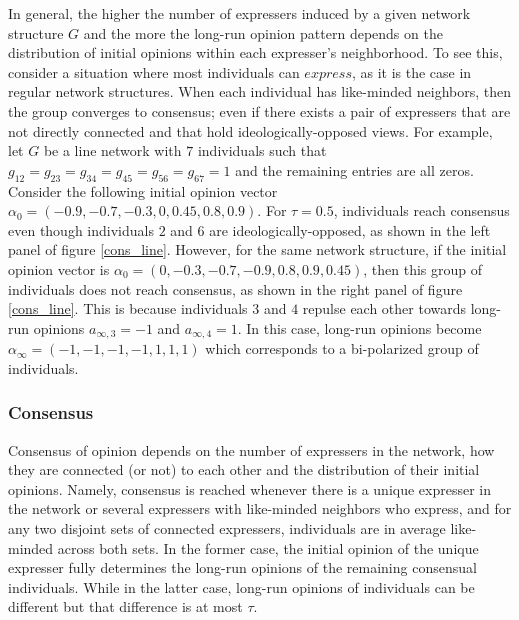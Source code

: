 \documentclass{article}
\begin{document}
In general, the higher the number of expressers induced by a given network structure $G$ and the more the long-run opinion pattern depends on the distribution of initial opinions within each expresser's neighborhood. To see this, consider a situation where most individuals can $express$, as it is the case in regular network structures. When each individual has like-minded neighbors, then the group converges to consensus; even if there exists a pair of expressers that are not directly connected and that hold ideologically-opposed views. For example, let $G$ be a line network with $7$ individuals such that $g_{12}=g_{23}=g_{34}=g_{45}=g_{56}=g_{67}=1$ and the remaining entries are all zeros. Consider the following initial opinion vector $\alpha_{0}=(-0.9,-0.7,-0.3,0,0.45,0.8,0.9)$. For $\tau=0.5$, individuals reach consensus even though individuals $2$ and $6$ are ideologically-opposed, as shown in the left panel of figure \ref{cons_line}.  However, for the same network structure, if the initial opinion vector is $\alpha_{0}=(0,-0.3,-0.7,-0.9,0.8,0.9,0.45)$, then this group of individuals does not reach consensus, as shown in the right panel of figure \ref{cons_line}. This is because individuals $3$ and $4$ repulse each other towards long-run opinions $a_{\infty,3} =-1$ and $a_{\infty,4} = 1$. In this case, long-run opinions become $\alpha_{\infty}=(-1 , -1 , -1, -1, 1, 1,1)$ which corresponds to a bi-polarized group of individuals. 



\subsubsection{Consensus}
Consensus of opinion depends on the number of expressers in the network, how they are connected (or not) to each other and the distribution of their initial opinions. Namely, consensus is reached whenever there is a unique expresser in the network or several expressers with like-minded neighbors who express, and for any two disjoint sets of connected expressers, individuals are in average  like-minded across both sets. In the former case, the initial opinion of the unique expresser fully determines the long-run opinions of the remaining consensual individuals. While in the latter case, long-run opinions of individuals can be different but that difference is at most $\tau$. 
\end{document}
